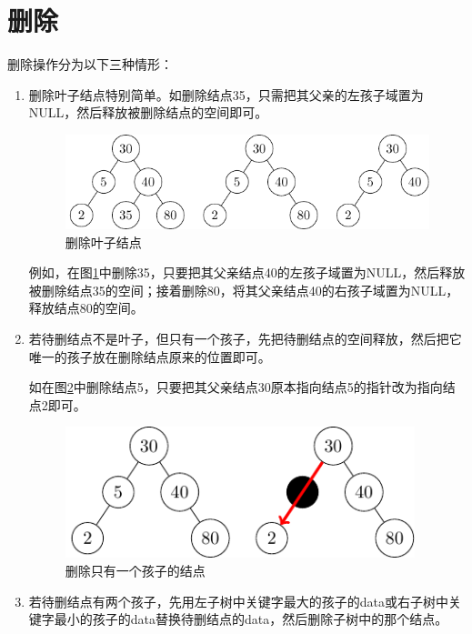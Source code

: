 \documentclass[10pt]{article}
\begin{document}





\section{删除}
删除操作分为以下三种情形：
\begin{enumerate}
\item 删除叶子结点特别简单。如删除结点35，只需把其父亲的左孩子域置为NULL，然后释放被删除结点的空间即可。
\begin{figure}[htbp]
\centering
\includegraphics[width=5in]{TIKZ/bst/bst_delete1.pdf}  
\caption{删除叶子结点}\label{delete1}
\end{figure}

例如，在图\ref{delete1}中删除35，只要把其父亲结点40的左孩子域置为NULL，然后释放被删除结点35的空间；接着删除80，将其父亲结点40的右孩子域置为NULL，释放结点80的空间。

\item 若待删结点不是叶子，但只有一个孩子，先把待删结点的空间释放，然后把它唯一的孩子放在删除结点原来的位置即可。

如在图\ref{delete2}中删除结点5，只要把其父亲结点30原本指向结点5的指针改为指向结点2即可。
\begin{figure}[htbp]
\centering
\includegraphics[width=4in]{TIKZ/bst/bst_delete2.pdf}  
\caption{删除只有一个孩子的结点}\label{delete2}
\end{figure}
\item 若待删结点有两个孩子，先用左子树中关键字最大的孩子的data或右子树中关键字最小的孩子的data替换待删结点的data，然后删除子树中的那个结点。


\end{enumerate}
\end{document}
